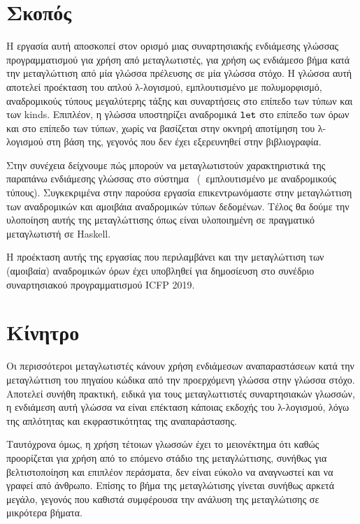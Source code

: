 \section{Σκοπός}

Η εργασία αυτή αποσκοπεί στον ορισμό μιας συναρτησιακής ενδιάμεσης γλώσσας προγραμματισμού για
χρήση από μεταγλωτιστές, για χρήση ως ενδιάμεσο βήμα κατά την μεταγλώττιση από μία γλώσσα πρέλευσης
σε μία γλώσσα στόχο. Η γλώσσα αυτή αποτελεί προέκταση του απλού λ-λογισμού, εμπλουτισμένο με πολυμορφισμό, αναδρομικούς τύπους μεγαλύτερης τάξης και συναρτήσεις στο επίπεδο των τύπων και των
kinds. Επιπλέον, η γλώσσα υποστηρίζει αναδρομικά $\operatorname{\texttt{let}}$ στο επίπεδο των όρων και στο επίπεδο των τύπων, χωρίς να βασίζεται στην οκνηρή αποτίμηση του λ-λογισμού στη βάση της,
  γεγονός που δεν έχει εξερευνηθεί στην βιβλιογραφία.

  Στην συνέχεια δείχνουμε πώς μπορούν να μεταγλωτιστούν χαρακτηριστικά της παραπάνω ενδιάμεσης
  γλώσσας στο σύστημα \FOMF ~(\FOM ~εμπλουτισμένο με αναδρομικούς τύπους). Συγκεκριμένα στην
  παρούσα εργασία επικεντρωνόμαστε στην μεταγλώττιση των αναδρομικών και αμοιβάια αναδρομικών τύπων
  δεδομένων. Τέλος θα δούμε την υλοποίηση αυτής της μεταγλώττισης όπως είναι υλοποιημένη σε πραγματικό
  μεταγλωτιστή σε Haskell.

  Η προέκταση αυτής της εργασίας που περιλαμβάνει και την μεταγλώττιση των (αμοιβαία) αναδρομικών όρων
  έχει υποβληθεί για δημοσίευση στο συνέδριο συναρτησιακού προγραμματισμού ICFP 2019.

  \section{Κίνητρο}

  Οι περισσότεροι μεταγλωτιστές κάνουν χρήση ενδιάμεσων αναπαραστάσεων κατά την μεταγλώττιση του
  πηγαίου κώδικα από την προερχόμενη γλώσσα στην γλώσσα στόχο. Αποτελεί συνήθη πρακτική, ειδικά για
  τους μεταγλωττιστές συναρτησιακών γλωσσών, η ενδιάμεση αυτή γλώσσα να είναι επέκταση κάποιας
  εκδοχής του λ-λογισμού, λόγω της απλότητας και εκφραστικότητας της αναπαράστασης.

  Ταυτόχρονα όμως, η χρήση τέτοιων γλωσσών έχει το μειονέκτημα ότι καθώς προορίζεται για χρήση από το
  επόμενο στάδιο της μεταγλώττισης, συνήθως για βελτιστοποίηση και επιπλέον περάσματα, δεν είναι εύκολο
  να αναγνωστεί και να γραφεί από άνθρωπο. Επίσης το βήμα της μεταγλώτισης γίνεται συνήθως αρκετά
  μεγάλο, γεγονός που καθιστά συμφέρουσα την ανάλυση της μεταγλώτισης σε μικρότερα βήματα.

